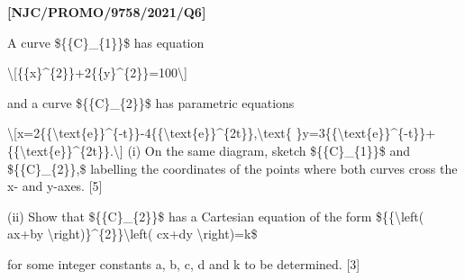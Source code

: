 \item \textbf{{[}NJC/PROMO/9758/2021/Q6{]}}

A curve \$\{\{C\}\_\{1\}\}\$ has equation

\textbackslash{[}\{\{x\}\textasciicircum\{2\}\}+2\{\{y\}\textasciicircum\{2\}\}=100\textbackslash{]}

and a curve \$\{\{C\}\_\{2\}\}\$ has parametric equations

\textbackslash{[}x=2\{\{\textbackslash text\{e\}\}\textasciicircum\{-t\}\}-4\{\{\textbackslash text\{e\}\}\textasciicircum\{2t\}\},\textbackslash text\{
\}y=3\{\{\textbackslash text\{e\}\}\textasciicircum\{-t\}\}+\{\{\textbackslash text\{e\}\}\textasciicircum\{2t\}\}.\textbackslash{]}
(i) On the same diagram, sketch \$\{\{C\}\_\{1\}\}\$ and \$\{\{C\}\_\{2\}\},\$
labelling the coordinates of the points where both curves cross the
x- and y-axes. {[}5{]} 

(ii) Show that \$\{\{C\}\_\{2\}\}\$ has a Cartesian equation of the
form \$\{\{\textbackslash left( ax+by \textbackslash right)\}\textasciicircum\{2\}\}\textbackslash left(
cx+dy \textbackslash right)=k\$

for some integer constants a, b, c, d and k to be determined. {[}3{]}